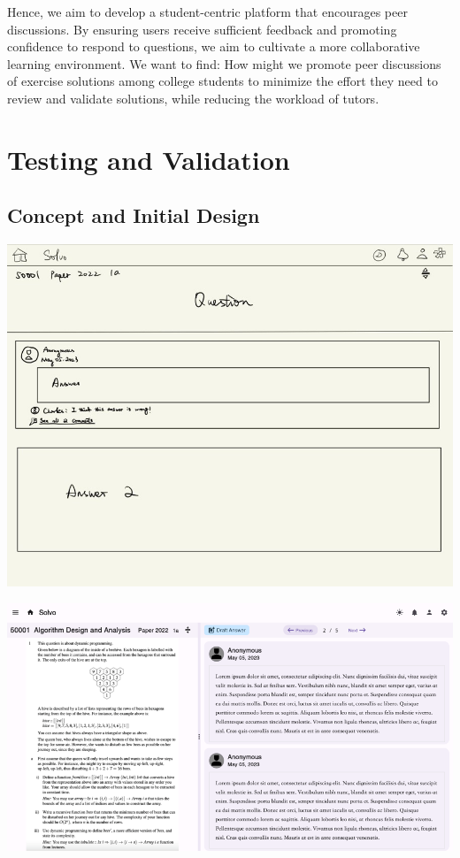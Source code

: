 \documentclass[a4paper]{article}
\begin{document}
    Hence, we aim to develop a student-centric platform that encourages peer discussions.
    By ensuring users receive sufficient feedback and promoting confidence to respond to questions, we aim to cultivate a more collaborative learning environment.
    We want to find: How might we promote peer discussions of exercise solutions among college students to minimize the effort they need to review and validate solutions,
    while reducing the workload of tutors.

    \section*{Testing and Validation}

    \subsection*{Concept and Initial Design}
    \noindent \begin{minipage}{0.4\textwidth}
                  \centering
                  \includegraphics[width=\textwidth]{concept2}
    \end{minipage}\hspace{0.05\textwidth}
    \begin{minipage}{0.57\textwidth}
        \centering
        \includegraphics[width=\textwidth]{question-page2}
    \end{minipage}
\end{document}
